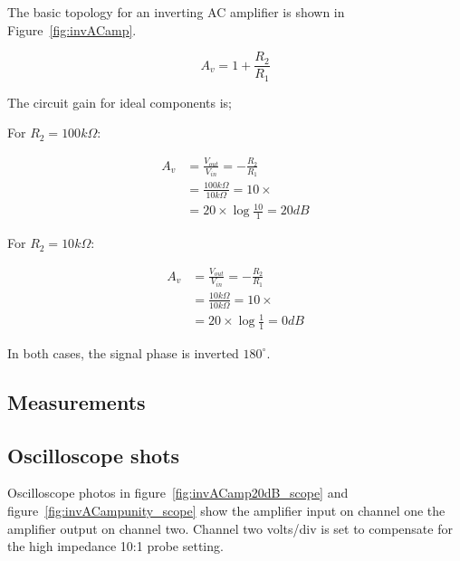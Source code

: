 \documentclass[11pt,a4paper]{article}
\begin{document}
The basic topology for an inverting AC amplifier is shown in
Figure~\ref{fig:invACamp}.


\begin{equation}
    A_v = 1+\frac{R_2}{R_1}
\end{equation}

The circuit gain for ideal components is;

For $R_2 = 100k\Omega$:

\begin{align} 
A_v     &= \frac{V_{out}}{V_{in}} = -\frac{R_2}{R_1}\\
        &= \frac{100k\Omega}{10k\Omega} = 10\times\\
        &= 20 \times \log{\frac{10}{1}} = 20dB  
\end{align}

For $R_2 = 10k\Omega$:

\begin{align} 
A_v     &= \frac{V_{out}}{V_{in}} = -\frac{R_2}{R_1}\\
        &= \frac{10k\Omega}{10k\Omega} = 10\times\\
        &= 20 \times \log{\frac{1}{1}} = 0dB  
\end{align}

In both cases, the signal phase is inverted $180^\circ$.


\subsection{Measurements}\label{invAC-measurements-1}


\subsection{Oscilloscope shots}\label{invAC-oscilloscope-shots}
Oscilloscope photos in figure~\ref{fig:invACamp20dB_scope} and
figure~\ref{fig:invACampunity_scope} show the amplifier input on channel one
the amplifier output on channel two.  Channel two volts/div is set to
compensate for the high impedance 10:1 probe setting. 
\end{document}
